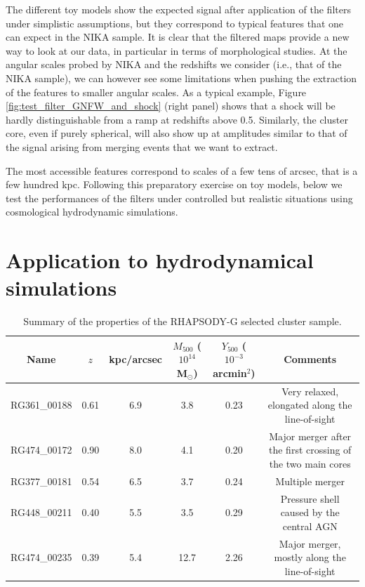 \documentclass[traditabstract]{aa}
\begin{document}
The different toy models show the expected signal after application of the filters under simplistic assumptions, but they correspond to typical features that one can expect in the NIKA sample. It is clear that the filtered maps provide a new way to look at our data, in particular in terms of morphological studies. At the angular scales probed by NIKA and the redshifts we consider (i.e., that of the NIKA sample), we can however see some limitations when pushing the extraction of the features to smaller angular scales. As a typical example, Figure \ref{fig:test_filter_GNFW_and_shock} (right panel) shows that a shock will be hardly distinguishable from a ramp at redshifts above 0.5. Similarly, the cluster core, even if purely spherical, will also show up at amplitudes similar to that of the signal arising from merging events that we want to extract. 

The most accessible features correspond to scales of a few tens of arcsec, that is a few hundred kpc. Following this preparatory exercise on toy models, below we test the performances of the filters under controlled but realistic situations using cosmological hydrodynamic simulations.

\section{Application to hydrodynamical simulations}\label{sec:Application_to_hydrodynamical_simulations}
\begin{table}[]
\caption{\footnotesize{Summary of the properties of the RHAPSODY-G selected cluster sample.}}
\begin{center}
\begin{tabular}{c|c|c|c|c|c}
\hline
\hline
Name & $z$ & kpc/arcsec & $M_{500}$ ($10^{14}$ M$_{\odot}$)& $Y_{500}$ ($10^{-3}$arcmin$^2$) & Comments \\
\hline
RG361\_00188 & 0.61 & 6.9 & 3.8 & 0.23 & Very relaxed, elongated along the line-of-sight \\ 
RG474\_00172 & 0.90 & 8.0 & 4.1 & 0.20 & Major merger after the first crossing of the two main cores \\ 
RG377\_00181 & 0.54 & 6.5 & 3.7 & 0.24 & Multiple merger \\
RG448\_00211 & 0.40 & 5.5 & 3.5 & 0.29 & Pressure shell caused by the central AGN \\ 
RG474\_00235 & 0.39 & 5.4 & 12.7 & 2.26 & Major merger, mostly along the line-of-sight \\ 
\hline
\end{tabular}
\end{center}
\label{tab:rhapsody_summary}
\end{table}
\end{document}
